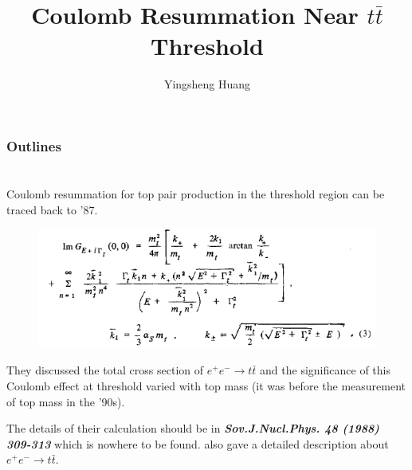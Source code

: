 \documentclass[8pt,dvipsnames,table]{beamer}
\title{Coulomb Resummation Near $t\bar t$ Threshold}
\author[Y. Huang]{Yingsheng Huang}
\institute[IHEP]{Institute of High Energy Physics}
\date
\begin{document}
\begin{frame}{}
	\maketitle
\end{frame}

\begin{frame}
	\frametitle{Outlines}
	\tableofcontents
\end{frame}

\section{\citet{Fadin1987}}
\begin{frame}
	\frametitle{\citet{Fadin1987}}

	Coulomb resummation for top pair production in the threshold region can be traced back to '87\citep{Fadin1987}.
	\begin{figure}[!htb]
		\centering
		\includegraphics[width=\linewidth]{image1.png}
		\label{fig:image1}
	\end{figure}
	They discussed the total cross section of $e^+e^-\to t\bar t$ and the significance of this Coulomb effect at threshold varied with top mass (it was before the measurement of top mass in the '90s).

	\pause
	The details of their calculation should be in \textbf{\textit{Sov.J.Nucl.Phys. 48 (1988) 309-313}} which is nowhere to be found. \textbf{\textit{\citet{Strassler:1990nw}}} also gave a detailed description about $e^+e^-\to t\bar t$. 


\end{frame}
\end{document}
